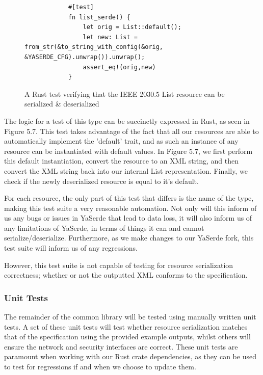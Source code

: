 \begin{figure}[h]
    \begin{center}
        \begin{lstlisting}
            #[test]
            fn list_serde() {
                let orig = List::default();
                let new: List = from_str(&to_string_with_config(&orig, &YASERDE_CFG).unwrap()).unwrap();
                assert_eq!(orig,new)
            }
        \end{lstlisting}
        \label{fig:yaserdetest}
        \vspace{-10pt}
        \caption{A Rust test verifying that the IEEE 2030.5 List resource can be serialized \& deserialized}
    \end{center}
\end{figure}

The logic for a test of this type can be succinctly expressed in Rust, as seen in Figure 5.7. 
This test takes advantage of the fact that all our resources are able to automatically implement the 'default' trait, and as such an instance of any resource can be instantiated with default values.
In Figure 5.7, we first perform this default instantiation, convert the resource to an XML string, and then convert the XML string back into our internal List representation. 
Finally, we check if the newly deserialized resource is equal to it's default.

For each resource, the only part of this test that differs is the name of the type, making this test suite a very reasonable automation.
Not only will this inform of us any bugs or issues in YaSerde that lead to data loss, it will also inform us of any limitations of YaSerde, in terms of things it can and cannot serialize/deserialize.
Furthermore, as we make changes to our YaSerde fork, this test suite will inform us of any regressions.

However, this test suite is not capable of testing for resource serialization correctness; whether or not the outputted XML conforms to the specification. 

\subsubsection{Unit Tests}
The remainder of the common library will be tested using manually written unit tests.
A set of these unit tests will test whether resource serialization matches that of the specification using the provided example outputs, whilst others will ensure the network and security interfaces are correct.
These unit tests are paramount when working with our Rust crate dependencies, as they can be used to test for regressions if and when we choose to update them.


